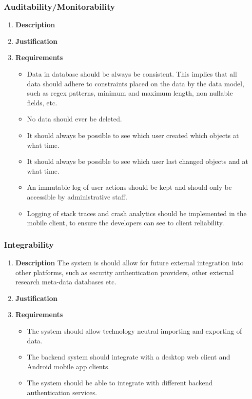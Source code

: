 \documentclass[a4paper,10pt]{article}
\begin{document}
\subsubsection{Auditability/Monitorability}
\begin{enumerate}
\item \textbf{Description}
\item \textbf{Justification}
\item \textbf{Requirements}
	\begin{itemize}
		\item Data in database should be always be consistent. This implies that all data should adhere to constraints placed on the data by the data model, such as regex patterns, minimum and maximum length, non nullable fields, etc.
		\item No data should ever be deleted.
		\item It should always be possible to see which user created which objects at what time.
		\item It should always be possible to see which user last changed objects and at what time.
		\item An immutable log of user actions should be kept and should only be accessible by administrative staff.
		\item Logging of stack traces and crash analytics should be implemented in the mobile client, to ensure the developers can see to client reliability.
	\end{itemize}
\end{enumerate}

\subsubsection{Integrability}
\begin{enumerate}
\item \textbf{Description}
The system is should allow for future external integration into other platforms, such as security authentication providers, other external research meta-data databases etc.
\item \textbf{Justification}
\item \textbf{Requirements}
	\begin{itemize}
		\item The system should allow technology neutral importing and exporting of data.
		\item The backend system should integrate with a desktop web client and Android mobile app clients.
		\item The system should be able to integrate with different backend authentication services.
	\end{itemize}
\end{enumerate}
\end{document}
